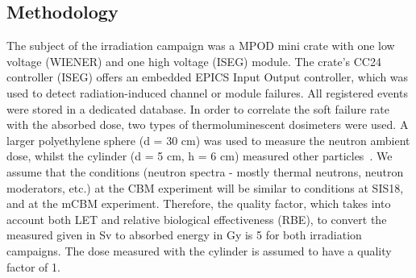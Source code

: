 \subsection{Methodology}
The subject of the irradiation campaign was a MPOD mini crate with one low voltage (WIENER) and one high voltage (ISEG) module. The crate's CC24 controller (ISEG) offers an embedded \gls{EPICS} Input Output controller, which was used to detect radiation-induced channel or module failures. All registered events were stored in a dedicated database.  In order to correlate the soft failure rate with the absorbed dose, two types of thermoluminescent dosimeters were used. A larger polyethylene sphere (d = 30 cm) was used to measure the neutron ambient dose, whilst the cylinder (d = 5 cm, h = 6 cm) measured other particles~\cite{bonner}. We assume that the conditions (neutron spectra - mostly thermal neutrons, neutron moderators, etc.) at the \gls{CBM} experiment will be similar to conditions at SIS18, and at the mCBM experiment. Therefore, the quality factor, which takes into account both \gls{LET} and relative biological effectiveness (\gls{RBE}), to convert the measured given in Sv to absorbed energy in Gy is 5 for both irradiation campaigns. The dose measured with the cylinder is assumed to have a quality factor of 1.

